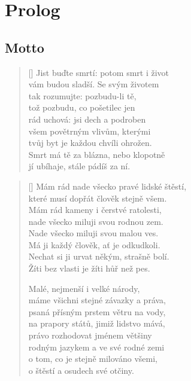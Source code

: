\documentclass[../dejiny-rodu-prusiku.tex]{subfiles}
\begin{document}
\chapter{Prolog}



\section{Motto}

\renewcommand{\poemtoc}{subsection}
\settowidth{\versewidth}{Smrt má tě za blázna, nebo klopotně}
\begin{verse}[\versewidth]
Jist buďte smrtí: potom smrt i život \\
vám budou sladší. Se svým životem \\
tak rozumujte: pozbudu-li tě, \\
tož pozbudu, co pošetilec jen \\
rád uchová: jsi dech a podroben \\
všem povětrným vlivům, kterými \\
tvůj byt je každou chvíli ohrožen. \\
Smrt má tě za blázna, nebo klopotně \\
jí ubíhaje, stále pádíš za ní.

\end{verse}

\renewcommand{\poemtoc}{subsection}
\settowidth{\versewidth}{Mám rád nade všecko pravé lidské štěstí,}
\begin{verse}[\versewidth]
Mám rád nade všecko pravé lidské štěstí, \\
které musí dopřát člověk stejně všem. \\
Mám rád kameny i čerstvé ratolesti, \\
nade všecko miluji svou rodnou zem. \\
Nade všecko miluji svou malou ves. \\
Má ji každý člověk, ať je odkudkoli. \\
Nechat si ji urvat někým, strašně bolí. \\
Žíti bez vlasti je žíti hůř než pes.

Malé, nejmenší i velké národy, \\
máme všichni stejné závazky a práva, \\
psaná přísným prstem větru na vody, \\
na prapory států, jimiž lidstvo mává, \\
právo rozhodovat jménem většiny \\
rodným jazykem a ve své rodné zemi \\
o tom, co je stejně milováno všemi, \\
o štěstí a osudech své otčiny.

\end{verse}
\end{document}
